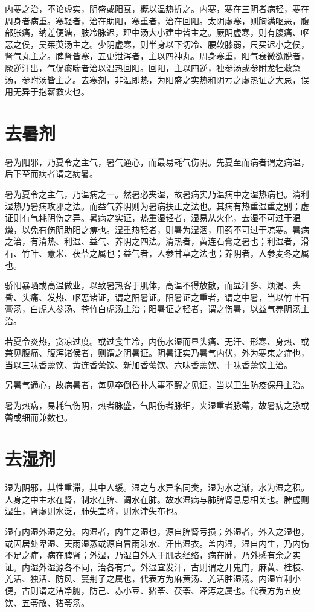 \documentclass[UTF8]{ctexart}
\begin{document}
内寒之治，不论虚实，阴盛或阳衰，概以温热折之。内寒，寒在三阴者病轻，寒在周身者病重。寒轻者，治在助阳，寒重者，治在回阳。太阴虚寒，则胸满呕恶，腹部胀痛，纳差便溏，肢冷脉迟，理中汤大小建中皆主之。厥阴虚寒，则有腹痛、呕恶之侯，吴茱萸汤主之。少阴虚寒，则半身以下切冷、腰软膝弱，尺买迟小之侯，肾气丸主之。脾肾皆寒，五更泄泻者，主以四神丸。周身寒重，阳气衰微欲脱者，厥逆汗出，气促痰喘者治以温热回阳。回阳，主以四逆，独参汤或参附龙牡救急汤，参附汤皆主之。去寒剂，非温即热，为阳盛之实热和阴亏之虚热证之大忌，误用无异于抱薪救火也。

\section{去暑剂}
暑为阳邪，乃夏令之主气，暑气通心，而最易耗气伤阴。先夏至而病者谓之病温，后下至而病者谓之病暑。 

暑为夏令之主气，乃温病之一。然暑必夹湿，故暑病实乃温病中之湿热病也。清利湿热乃暑病攻邪之法。而益气养阴则为暑病扶正之法也。其病有热重湿重之别；虚证则有气耗阴伤之异。暑病之实证，热重湿轻者，湿易从火化，去湿不可过于温燥，以免有伤阴助阳之痹也。湿重热轻者，则暑为湿涸，用药不可过于凉寒。暑病之治，有清热、利湿、益气、养阴之四法。清热者，黄连石膏之暑也；利湿者，滑石、竹叶、薏米、茯苓之属也；益气者，人参甘草之法也；养阴者，人参麦冬之属也。

骄阳暴晒或高温做业，以致暑热客于肌体，高温不得放散，而显汗多、烦渴、头昏、头痛、发热、呕恶诸证，谓之阳暑证。阳暑证之重者，谓之中暑，当以竹叶石膏汤，白虎人参汤、苍竹白虎汤主治；阳暑证之轻者，谓之伤暑，以益气养阴汤主治。

若夏令炎热，贪凉过度。或过食生冷，内伤水湿而显头痛、无汗、形寒、身热、或兼见腹痛、腹泻诸侯者，则谓之阴暑证。阴暑证实乃暑气内伏，外为寒束之症也，当以三味香薷饮、黄连香薷饮、新加香薷饮、六味香薷饮、十味香薷饮主治。

另暑气通心，故病暑者，每见卒倒昏扑人事不醒之见证，当以卫生防疫保丹主治。

暑为热病，易耗气伤阴，热者脉盛，气阴伤者脉细，夹湿重者脉薷，故暑病之脉或薷或细而兼数也。

\section{去湿剂}
湿为阴邪，其性重滞，其中人缓。湿之与水异名同类，湿为水之渐，水为湿之积。人身之中主水在肾，制水在脾、调水在肺。故水湿病与肺脾肾息息相关也。脾虚则湿生，肾虚则水泛，肺失宣降，则水津失布也。

湿有内湿外湿之分。内湿者，内生之湿也，源自脾肾亏损；外湿者，外入之湿也，或因居处卑湿、天雨湿蒸或源自冒雨涉水、汗出湿衣。盖内湿，湿自内生，乃内伤不足之症，病在脾肾；外湿，乃湿自外入于肌表经络，病在肺，乃外感有余之实证。内湿外湿源各不同，治各有异。外湿宜发汗，古则谓之开鬼门，麻黄、桂枝、羌活、独活、防风、蔓荆子之属也，代表方为麻黄汤、羌活胜湿汤。内湿宜利小便，古则谓之洁净腑，防己、赤小豆、猪苓、茯苓、泽泻之属也。代表方为五皮饮、五苓散、猪苓汤。
\end{document}
